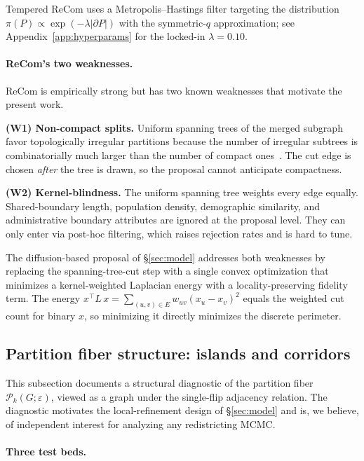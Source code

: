 \documentclass[11pt]{article}
\begin{document}
Tempered ReCom uses a Metropolis--Hastings filter targeting the
distribution $\pi(P) \propto \exp(-\lambda |\partial P|)$ with the
symmetric-$q$ approximation; see Appendix~\ref{app:hyperparams} for
the locked-in $\lambda = 0.10$.

\paragraph{ReCom's two weaknesses.}\label{sec:background-weakness}
ReCom is empirically strong but has two known weaknesses that motivate
the present work.

\textbf{(W1) Non-compact splits.} Uniform spanning trees of the
merged subgraph favor topologically irregular partitions because the
number of irregular subtrees is combinatorially much larger than the
number of compact ones~\cite{deford2021recombination,deford2019total}.
The cut edge is chosen \emph{after} the tree is drawn, so the
proposal cannot anticipate compactness.

\textbf{(W2) Kernel-blindness.} The uniform spanning tree weights
every edge equally. Shared-boundary length, population density,
demographic similarity, and administrative boundary attributes are
ignored at the proposal level. They can only enter via post-hoc
filtering, which raises rejection rates and is hard to tune.

The diffusion-based proposal of \S\ref{sec:model} addresses both
weaknesses by replacing the spanning-tree-cut step with a single
convex optimization that minimizes a kernel-weighted Laplacian energy
with a locality-preserving fidelity term. The energy
$x^\top L\, x = \sum_{(u,v) \in E} w_{uv} (x_u - x_v)^2$ equals the
weighted cut count for binary $x$, so minimizing it directly minimizes
the discrete perimeter.

\subsection{Partition fiber structure: islands and corridors}\label{sec:fiber-corridors}

This subsection documents a structural diagnostic of the partition fiber
$\mathcal{P}_k(G; \varepsilon)$, viewed as a graph under the
single-flip adjacency relation. The diagnostic motivates the
local-refinement design of \S\ref{sec:model} and is, we believe, of
independent interest for analyzing any redistricting MCMC.

\paragraph{Three test beds.}\label{sec:fiber-testbeds}
\end{document}
